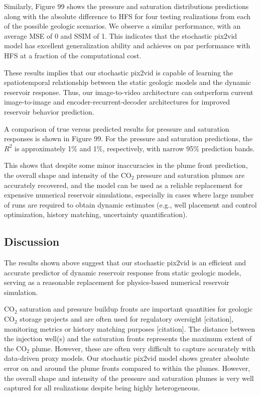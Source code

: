 \documentclass[default,iicol]{sn-jnl}
\begin{document}
Similarly, Figure 99 shows the pressure and saturation distributions predictions along with the absolute difference to HFS for four testing realizations from each of the possible geologic scenarios. We observe a similar performance, with an average MSE of 0 and SSIM of 1. This indicates that the stochastic pix2vid model has excellent generalization ability and achieves on par performance with HFS at a fraction of the computational cost.

These results implies that our stochastic pix2vid is capable of learning the spatiotemporal relationship between the static geologic models and the dynamic reservoir response. Thus, our image-to-video architecture can outperform current image-to-image and encoder-recurrent-decoder architectures for improved reservoir behavior prediction.

A comparison of true versus predicted results for pressure and saturation responses is shown in Figure 99. For the pressure and saturation predictions, the $R^2$ is approximately 1\% and 1\%, respectively, with narrow 95\% prediction bands. 

This shows that despite some minor inaccuracies in the plume front prediction, the overall shape and intensity of the CO$_2$ pressure and saturation plumes are accurately recovered, and the model can be used as a reliable replacement for expensive numerical reservoir simulations, especially in cases where large number of runs are required to obtain dynamic estimates (e.g., well placement and control optimization, history matching, uncertainty quantification).

\subsection{Discussion} \label{subsec3_discussion}
The results shown above suggest that our stochastic pix2vid is an efficient and accurate predictor of dynamic reservoir response from static geologic models, serving as a reasonable replacement for physics-based numerical reservoir simulation. 

CO$_2$ saturation and pressure buildup fronts are important quantities for geologic CO$_2$ storage projects and are often used for regulatory oversight [citation], monitoring metrics or history matching purposes [citation]. The distance between the injection well(s) and the saturation fronts represents the maximum extent of the CO$_2$ plume. However, these are often very difficult to capture accurately with data-driven proxy models. Our stochastic pix2vid model shows greater absolute error on and around the plume fronts compared to within the plumes. However, the overall shape and intensity of the pressure and saturation plumes is very well captured for all realizations despite being highly heterogeneous. 
\end{document}
